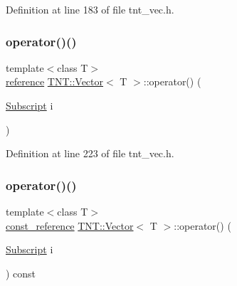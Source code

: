 Definition at line 183 of file tnt\+\_\+vec.\+h.

\mbox{\label{classTNT_1_1Vector_a3c64911f1a80247c6a973f68d7196038}} 
\subsubsection{\texorpdfstring{operator()()}{operator()()}\hspace{0.1cm}{\footnotesize\ttfamily [1/2]}}
{\footnotesize\ttfamily template$<$class T$>$ \\
\hyperlink{classTNT_1_1Vector_a9cdf62749080406bdf3fbace264dac85}{reference} \hyperlink{classTNT_1_1Vector}{T\+N\+T\+::\+Vector}$<$ T $>$\+::operator() (\begin{DoxyParamCaption}\item[{\hyperlink{namespaceTNT_af22e3f1460e145c04ce4e7d701e4c1c1}{Subscript}}]{i }\end{DoxyParamCaption})\hspace{0.3cm}{\ttfamily [inline]}}



Definition at line 223 of file tnt\+\_\+vec.\+h.

\mbox{\label{classTNT_1_1Vector_a5a75964f8c9f814d7a2f011150b2a06b}} 
\subsubsection{\texorpdfstring{operator()()}{operator()()}\hspace{0.1cm}{\footnotesize\ttfamily [2/2]}}
{\footnotesize\ttfamily template$<$class T$>$ \\
\hyperlink{classTNT_1_1Vector_a2957faed9560f1f53bc5943a160d71bf}{const\+\_\+reference} \hyperlink{classTNT_1_1Vector}{T\+N\+T\+::\+Vector}$<$ T $>$\+::operator() (\begin{DoxyParamCaption}\item[{\hyperlink{namespaceTNT_af22e3f1460e145c04ce4e7d701e4c1c1}{Subscript}}]{i }\end{DoxyParamCaption}) const\hspace{0.3cm}{\ttfamily [inline]}}



